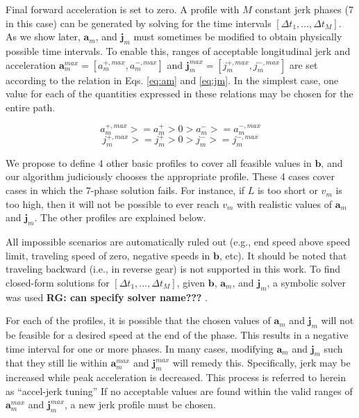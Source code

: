 \documentclass[letterpaper, 10 pt, conference]{ieeeconf}  %
\begin{document}
Final forward acceleration is set to zero.
A profile with $M$ constant jerk phases (7 in this case) can be generated by solving for the time intervals $[\Delta t_1, ..., \Delta t_M]$.
As we show later, $\mathbf{a}_m$, and $\mathbf{j}_m$ must sometimes be modified to obtain physically possible time intervals.
To enable this, ranges of acceptable longitudinal jerk and acceleration $\mathbf{a}^{max}_m = [a^{+,max}_m , a^{-,max}_m]$ and $\mathbf{j}^{max}_m = [j^{+,max}_m , j^{-,max}_m]$ are set according to the relation in Eqs. \ref{eq:am} and \ref{eq:jm}.
In the simplest case, one value for each of the quantities expressed in these relations may be chosen for the entire path.

\begin{equation}
  a^{+,max}_m >= a^+_m > 0 > a^-_m >= a^{-,max}_m
  \label{eq:am}
\end{equation}
\begin{equation}
  j^{+,max}_m >= j^+_m > 0 > j^-_m >= j^{-,max}_m
  \label{eq:jm}
\end{equation}

We propose to define 4 other basic profiles to cover all feasible values in $\mathbf{b}$, and our algorithm judiciously chooses the appropriate profile. These 4 cases cover cases in which the 7-phase solution fails. For instance, if $L$ is too short or $v_m$ is too high, then it will not be possible to ever reach $v_m$ with realistic values of $\mathbf{a}_m$ and $\mathbf{j}_m$.
The other profiles are explained below.

All impossible scenarios are automatically ruled out (e.g., end speed above speed limit, traveling speed of zero, negative speeds in $\mathbf{b}$, etc).
It should be noted that traveling backward (i.e., in reverse gear) is not supported in this work.
To find closed-form solutions for $[\Delta t_1, ..., \Delta t_M]$, given $\mathbf{b}$, $\mathbf{a}_m$, and $\mathbf{j}_m$, a symbolic solver was used \textbf{RG: can specify solver name???} .

For each of the profiles, it is possible that the chosen values of $\mathbf{a}_m$ and $\mathbf{j}_m$ will not be feasible for a desired speed at the end of the phase.
This results in a negative time interval for one or more phases.
In many cases, modifying $\mathbf{a}_m$ and $\mathbf{j}_m$ such that they still lie within $\mathbf{a}^{max}_m$ and $\mathbf{j}^{max}_m$ will remedy this.
Specifically, jerk may be increased while peak acceleration is decreased.
This process is referred to herein as ``accel-jerk tuning''
If no acceptable values are found within the valid ranges of $\mathbf{a}^{max}_m$ and $\mathbf{j}^{max}_m$, a new jerk profile must be chosen.
\end{document}
